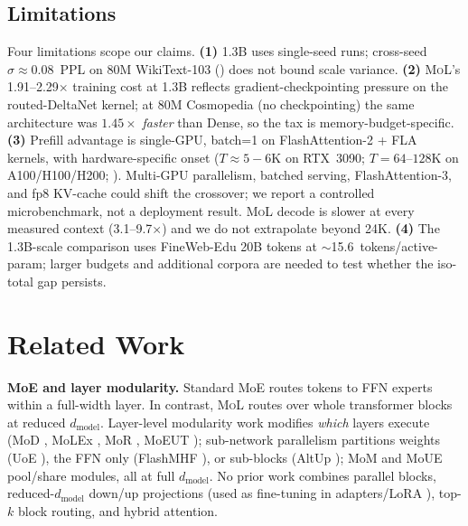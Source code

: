 \documentclass[10pt]{article}
\newcommand{\mol}{\textsc{MoL}}
\newcommand{\dmodel}{d_\text{model}}
\newcommand{\Paragraph}[1]{\vspace{0.5em}\noindent\textbf{#1}}
\begin{document}
\subsection{Limitations}
\label{sec:limitations}

Four limitations scope our claims.
\textbf{(1)} 1.3B uses single-seed runs; cross-seed $\sigma{\approx}0.08$~PPL on 80M WikiText-103 () does not bound scale variance.
\textbf{(2)} \mol{}'s 1.91--2.29$\times$ training cost at 1.3B reflects gradient-checkpointing pressure on the routed-DeltaNet kernel; at 80M Cosmopedia (no checkpointing) the same architecture was $1.45\times$ \emph{faster} than Dense, so the tax is memory-budget-specific.
\textbf{(3)} Prefill advantage is single-GPU, batch=1 on FlashAttention-2 + FLA kernels, with hardware-specific onset ($T{\approx}5{-}6$K on RTX~3090; $T{=}64$--$128$K on A100/H100/H200; ). Multi-GPU parallelism, batched serving, FlashAttention-3, and fp8 KV-cache could shift the crossover; we report a controlled microbenchmark, not a deployment result. \mol{} decode is slower at every measured context (3.1--9.7$\times$) and we do not extrapolate beyond 24K.
\textbf{(4)} The 1.3B-scale comparison uses FineWeb-Edu 20B tokens at $\sim$15.6~tokens/active-param; larger budgets and additional corpora are needed to test whether the iso-total gap persists.

\section{Related Work}
\label{sec:related}

\Paragraph{MoE and layer modularity.}
Standard MoE \citep{shazeer2017outrageously, fedus2022switch, zoph2022stmoe} routes tokens to FFN experts within a full-width layer. In contrast, \mol{} routes over whole transformer blocks at reduced $\dmodel$. Layer-level modularity work modifies \emph{which} layers execute (MoD \citep{raposo2024mod}, MoLEx \citep{teo2025molex}, MoR \citep{bae2025mor}, MoEUT \citep{csordas2024moeut}); sub-network parallelism partitions weights (UoE \citep{yang2025uoe}), the FFN only (FlashMHF \citep{zhang2026flashmhf}), or sub-blocks (AltUp \citep{baykal2023altup}); MoM \citep{gong2024mom} and MoUE \citep{chen2026moue} pool/share modules, all at full $\dmodel$. No prior work combines parallel blocks, reduced-$\dmodel$ down/up projections (used as fine-tuning in adapters/LoRA \citep{houlsby2019adapters,hu2022lora}), top-$k$ block routing, and hybrid attention.
\end{document}
